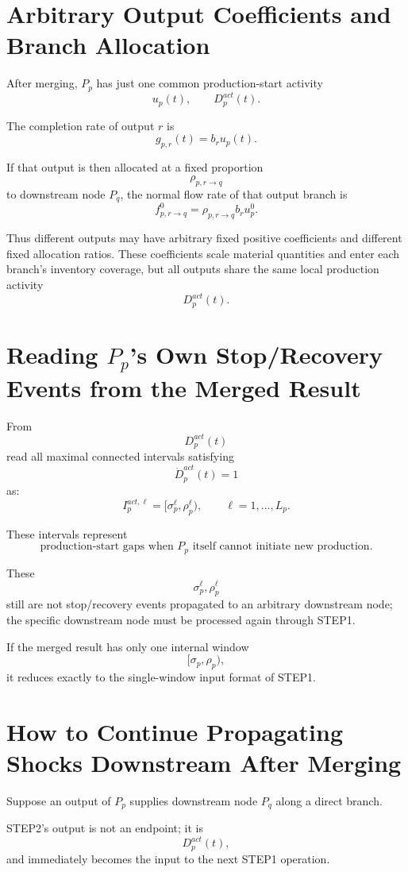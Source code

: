 \documentclass[11pt]{article}
\begin{document}
\section{Arbitrary Output Coefficients and Branch Allocation}

After merging, \(P_p\) has just one common production-start activity
\[
u_p(t),
\qquad
D_p^{act}(t).
\]

The completion rate of output \(r\) is
\[
g_{p,r}(t)=b_ru_p(t).
\]

If that output is then allocated at a fixed proportion
\[
\rho_{p,r\to q}
\]
to downstream node \(P_q\),
the normal flow rate of that output branch is
\[
\boxed{
f_{p,r\to q}^0
=
\rho_{p,r\to q}b_ru_p^0.
}
\tag{16}
\]

Thus different outputs may have arbitrary fixed positive coefficients and different fixed allocation ratios.
These coefficients scale material quantities and enter each branch's inventory coverage,
but all outputs share the same local production activity
\[
D_p^{act}(t).
\]

\section{Reading \(P_p\)'s Own Stop/Recovery Events from the Merged Result}

From
\[
D_p^{act}(t)
\]
read all maximal connected intervals satisfying
\[
\dot D_p^{act}(t)=1
\]
as:
\[
\boxed{
I_p^{act,\ell}
=
[\sigma_p^\ell,\rho_p^\ell),
\qquad
\ell=1,\ldots,L_p.
}
\tag{17}
\]

These intervals represent
\[
\boxed{
\text{production-start gaps when \(P_p\) itself cannot initiate new production}.
}
\]

These
\[
\sigma_p^\ell,\rho_p^\ell
\]
still are not stop/recovery events propagated to an arbitrary downstream node;
the specific downstream node must be processed again through STEP1.

If the merged result has only one internal window
\[
[\sigma_p,\rho_p),
\]
it reduces exactly to the single-window input format of STEP1.

\section{How to Continue Propagating Shocks Downstream After Merging}

Suppose an output of \(P_p\) supplies downstream node \(P_q\) along a direct branch.

STEP2's output is not an endpoint; it is
\[
\boxed{
D_p^{act}(t),
}
\]
and immediately becomes the input to the next STEP1 operation.
\end{document}
